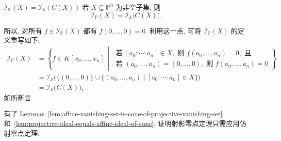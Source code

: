 \begin{Lemma}{$\mathcal{I}_{\mathbb{P}}(X)=\mathcal{I}_{\mathbb{A}}(C(X))$}\leavevmode\label{lem:projective-ideal-equals-affine-ideal-of-cone}
若 $X\subseteq\mathbb{P}^{n}$ 为非空子集, 则
\[
  \mathcal{I}_{\mathbb{P}}(X)=\mathcal{I}_{\mathbb{A}}\bigl(C(X)\bigr).
\]
\end{Lemma}
\begin{Proof}
所以, 对所有 $f\in\mathcal{I}_{\mathbb{P}}(X)$ 都有 $f(0,\ldots,0)=0$. 利用这一点, 可将 $\mathcal{I}_{\mathbb{P}}(X)$ 的定义重写如下:
\[
  \begin{aligned}
  \mathcal{I}_{\mathbb{P}}(X)
    &=\left\{f\in K[x_{0},\ldots,x_{n}]\ \middle|\
    \begin{gathered}
      \text{若 }[a_{0}:\cdots:a_{n}]\in X,\text{ 则 } f(a_{0},\ldots,a_{n})=0,\text{ 且}\\
      \text{若 }(a_{0},\ldots,a_{n})=(0,\ldots,0),\text{ 则 } f(a_{0},\ldots,a_{n})=0
    \end{gathered}\right\}\\
    &=\mathcal{I}_{\mathbb{A}}\bigl(\{(0,\ldots,0)\}\cup
      \{(a_{0},\ldots,a_{n})\mid[a_{0}:\cdots:a_{n}]\in X\}\bigr)\\
    &=\mathcal{I}_{\mathbb{A}}\bigl(C(X)\bigr),
  \end{aligned}
\]
如所断言.
\end{Proof}

有了 Lemmas~\ref{lem:affine-vanishing-set-is-cone-of-projective-vanishing-set} 和~\ref{lem:projective-ideal-equals-affine-ideal-of-cone}, 证明射影零点定理只需应用仿射零点定理.

